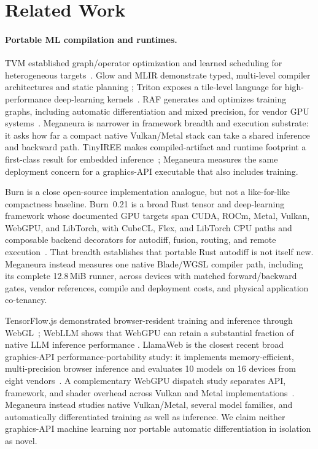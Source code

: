 \documentclass[10pt,twocolumn]{article}
\newcommand{\system}{Meganeura}
\begin{document}
\section{Related Work}

\paragraph{Portable ML compilation and runtimes.}
TVM established graph/operator optimization and learned scheduling for
heterogeneous targets~\cite{chen2018tvm}. Glow and MLIR demonstrate typed,
multi-level compiler architectures and static planning
\cite{rotem2018glow,lattner2021mlir}; Triton exposes a tile-level language for
high-performance deep-learning kernels~\cite{tillet2019triton}. RAF generates
and optimizes training graphs, including automatic differentiation and mixed
precision, for vendor GPU systems~\cite{yu2023raf}. \system{} is narrower in
framework breadth and execution substrate: it asks how far a compact native
Vulkan/Metal stack can take a shared inference and backward path. TinyIREE
makes compiled-artifact and runtime footprint a first-class result for
embedded inference~\cite{liu2022tinyiree}; \system{} measures the same
deployment concern for a graphics-API executable that also includes training.

Burn is a close open-source implementation analogue, but not a like-for-like
compactness baseline. Burn~0.21 is a broad Rust tensor and deep-learning
framework whose documented GPU targets span CUDA, ROCm, Metal, Vulkan,
WebGPU, and LibTorch, with CubeCL, Flex, and LibTorch CPU paths and composable
backend decorators for autodiff, fusion, routing, and remote
execution~\cite{simard2026burn}. That breadth establishes that portable Rust
autodiff is not itself new. \system{}
instead measures one native Blade/WGSL compiler path, including its complete
12.8\,MiB runner, across devices with matched forward/backward gates, vendor
references, compile and deployment costs, and physical application co-tenancy.

TensorFlow.js demonstrated browser-resident training and inference through
WebGL~\cite{smilkov2019tensorflowjs}; WebLLM shows that WebGPU can retain a
substantial fraction of native LLM inference performance
\cite{ruan2024webllm}. LlamaWeb is the closest recent broad graphics-API
performance-portability study: it implements memory-efficient,
multi-precision browser inference and evaluates 10 models on 16 devices from
eight vendors~\cite{levine2026llamaweb}. A complementary WebGPU dispatch study
separates API, framework, and shader overhead across Vulkan and Metal
implementations~\cite{maczan2026dispatch}. \system{} instead studies native
Vulkan/Metal, several model families, and automatically differentiated
training as well as inference. We claim neither graphics-API machine learning
nor portable automatic differentiation in isolation as novel.
\end{document}
